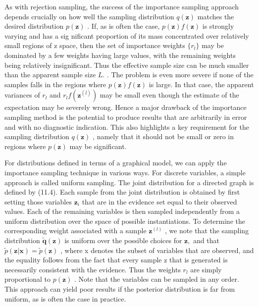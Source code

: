 \documentclass[
  10
]{article}
\newcounter{none} %
\begin{document}
As with rejection sampling, the success of the importance sampling
approach depends crucially on how well the sampling distribution
\(q ( \mathbf { z } )\) matches the desired distribution
\(p ( \mathbf { z } )\) . If, as is often the case,
\(p ( \mathbf { z } ) f ( \mathbf { z } )\) is strongly varying and has
a sig nificant proportion of its mass concentrated over relatively small
regions of z space, then the set of importance weights
\(\{ r _ { l } \}\) may be dominated by a few weights having large
values, with the remaining weights being relatively insignificant. Thus
the effective sample size can be much smaller than the apparent sample
size \(L .\) . The problem is even more severe if none of the samples
falls in the regions where \(p ( \mathbf { z } ) f ( \mathbf { z } )\)
is large. In that case, the apparent variances of \(r _ { l }\) and
\(r _ { l } f ( \mathbf { z } ^ { ( \overline { { l } } ) } )\) may be
small even though the estimate of the expectation may be severely wrong.
Hence a major drawback of the importance sampling method is the
potential to produce results that are arbitrarily in error and with no
diagnostic indication. This also highlights a key requirement for the
sampling distribution \(q ( \mathbf { z } )\) , namely that it should
not be small or zero in regions where \(p ( \mathbf { z } )\) may be
significant.

For distributions defined in terms of a graphical model, we can apply
the importance sampling technique in various ways. For discrete
variables, a simple approach is called uniform sampling. The joint
distribution for a directed graph is defined by (11.4). Each sample from
the joint distribution is obtained by first setting those variables
\(\mathbf { z } _ { i }\) that are in the evidence set equal to their
observed values. Each of the remaining variables is then sampled
independently from a uniform distribution over the space of possible
instantiations. To determine the corresponding weight associated with a
sample \(\mathbf { z } ^ { ( l ) }\) , we note that the sampling
distribution \(\widetilde { \boldsymbol { q } } ( \mathbf { z } )\) is
uniform over the possible choices for \(\mathbf { z } ,\) and that
\(\widetilde { p } ( \mathbf { z } | \mathbf { x } ) = \widetilde { p } ( \mathbf { z } )\)
, where x denotes the subset of variables that are observed, and the
equality follows from the fact that every sample z that is generated is
necessarily consistent with the evidence. Thus the weights \(r _ { l }\)
are simply proportional to \(p ( \mathbf { z } )\) . Note that the
variables can be sampled in any order. This approach can yield poor
results if the posterior distribution is far from uniform, as is often
the case in practice.
\end{document}
